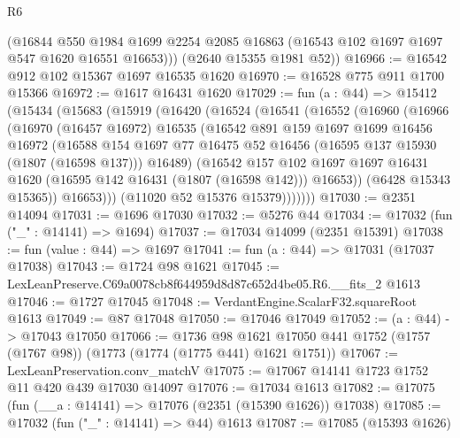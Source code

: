 \begin{lexlean}{R6}
\begin{coremodule}
        (@16844
          @550
          @1984
          @1699
          @2254
          @2085
          @16863
          (@16543 @102 @1697 @1697 @547 @1620 @16551 @16653)))
      (@2640 @15355 @1981 @52))
@16966 := @16542 @912 @102 @15367 @1697 @16535 @1620
@16970 := @16528 @775 @911 @1700 @15366
@16972 := @1617 @16431 @1620
@17029 := fun (a : @44) =>
  @15412
    (@15434
      (@15683
        (@15919
          (@16420
            (@16524
              (@16541
                (@16552
                  (@16960
                    (@16966
                      (@16970
                        (@16457 @16972)
                        @16535
                        (@16542
                          @891
                          @159
                          @1697
                          @1699
                          @16456
                          @16972
                          (@16588
                            @154
                            @1697
                            @77
                            @16475
                            @52
                            @16456
                            (@16595 @137 @15930 (@1807 (@16598 @137)))
                            @16489)
                          (@16542
                            @157
                            @102
                            @1697
                            @1697
                            @16431
                            @1620
                            (@16595 @142 @16431 (@1807 (@16598 @142)))
                            @16653))
                        (@6428 @15343 @15365))
                      @16653)))
                (@11020 @52 @15376 @15379)))))))
@17030 := @2351 @14094
@17031 := @1696 @17030
@17032 := @5276 @44
@17034 := @17032 (fun ("_" : @14141) => @1694)
@17037 := @17034 @14099 (@2351 @15391)
@17038 := fun (value : @44) => @1697
@17041 := fun (a : @44) => @17031 (@17037 @17038)
@17043 := @1724 @98 @1621
@17045 := LexLeanPreserve.C69a0078cb8f644959d8d87c652d4be05.R6.__fits_2 @1613
@17046 := @1727 @17045
@17048 := VerdantEngine.ScalarF32.squareRoot @1613
@17049 := @87 @17048
@17050 := @17046 @17049
@17052 := (a : @44) -> @17043 @17050
@17066 := @1736
    @98
    @1621
    @17050
    @441
    @1752
    (@1757 (@1767 @98))
    (@1773 (@1774 (@1775 @441) @1621 @1751))
@17067 := LexLeanPreservation.conv_matchV
@17075 := @17067 @14141 @1723 @1752 @11 @420 @439 @17030 @14097
@17076 := @17034 @1613
@17082 := @17075 (fun (__a : @14141) => @17076 (@2351 (@15390 @1626)) @17038)
@17085 := @17032 (fun ("_" : @14141) => @44) @1613
@17087 := @17085 (@15393 @1626)

\end{coremodule}
\end{lexlean}
